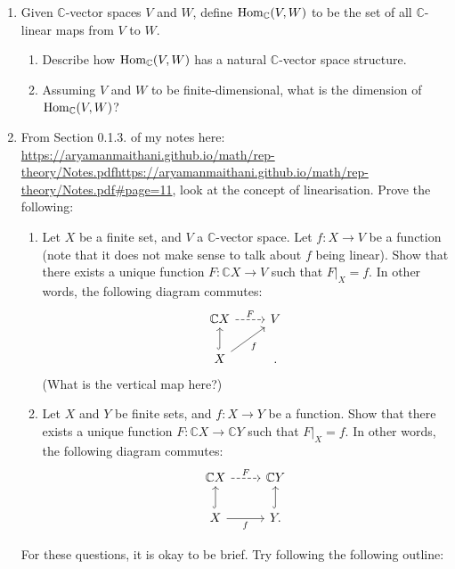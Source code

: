 \documentclass[12pt]{article}
\begin{document}
\begin{enumerate}
\begin{enumerate}
	\end{enumerate}
	\item Given $\mathbb{C}$-vector spaces $V$ and $W$, define $\operatorname{Hom}_{\mathbb{C}}(V, W)$ to be the set of all $\mathbb{C}$-linear maps from $V$ to $W$.
	\begin{enumerate}
		\item Describe how $\operatorname{Hom}_{\mathbb{C}}(V, W)$ has a natural $\mathbb{C}$-vector space structure.
		\item Assuming $V$ and $W$ to be finite-dimensional, what is the dimension of $\operatorname{Hom}_{\mathbb{C}}(V, W)$?
	\end{enumerate}
	\item From Section 0.1.3. of my notes here: \url{https://aryamanmaithani.github.io/math/rep-theory/Notes.pdfhttps://aryamanmaithani.github.io/math/rep-theory/Notes.pdf#page=11}, look at the concept of linearisation. Prove the following:
	\begin{enumerate}
		\item Let $X$ be a finite set, and $V$ a $\mathbb{C}$-vector space. Let $f : X \to V$ be a function (note that it does not make sense to talk about $f$ being linear). Show that there exists a unique function $F : \mathbb{C}X \to V$ such that $F|_{X} = f$. In other words, the following diagram commutes:
		\begin{equation*} 
			\begin{tikzcd}
				\mathbb{C}X \arrow[r, "F", dashed] & V \\
				X \arrow[u, hook] \arrow[ru, "f"'] & .
			\end{tikzcd}
		\end{equation*}
		(What is the vertical map here?)
		\item Let $X$ and $Y$ be finite sets, and $f : X \to Y$ be a function. Show that there exists a unique function $F : \mathbb{C}X \to \mathbb{C}Y$ such that $F|_{X} = f$. In other words, the following diagram commutes:
		\begin{equation*} 
			\begin{tikzcd}
				\mathbb{C}X \arrow[r, "F", dashed] & \mathbb{C}Y \\
				X \arrow[u, hook] \arrow[r, "f"'] & Y \arrow[u, hook].
			\end{tikzcd}
		\end{equation*}
	\end{enumerate}
	For these questions, it is okay to be brief. Try following the following outline:
	\begin{enumerate}[label=(\roman*)]

\end{enumerate}
\end{enumerate}
\end{document}
